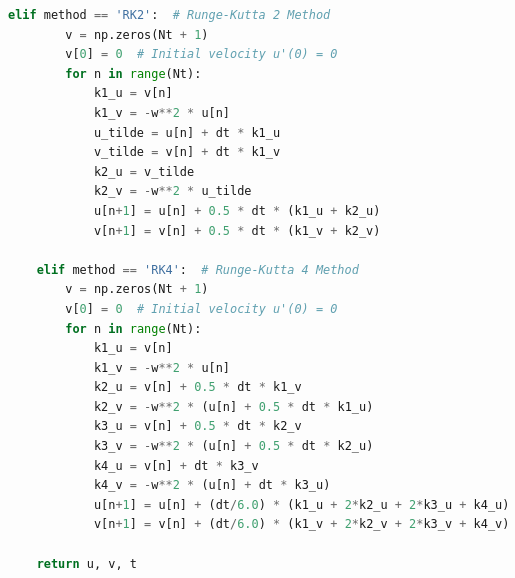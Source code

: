\documentclass[10pt, aspectratio=54]{beamer}
\begin{document}
\begin{frame}[fragile]{}
	\fontsize{5}{5}\selectfont
	\begin{lstlisting}[language=Python]
	elif method == 'RK2':  # Runge-Kutta 2 Method
		v = np.zeros(Nt + 1)
		v[0] = 0  # Initial velocity u'(0) = 0
		for n in range(Nt):
			k1_u = v[n]
			k1_v = -w**2 * u[n]
			u_tilde = u[n] + dt * k1_u
			v_tilde = v[n] + dt * k1_v
			k2_u = v_tilde
			k2_v = -w**2 * u_tilde
			u[n+1] = u[n] + 0.5 * dt * (k1_u + k2_u)
			v[n+1] = v[n] + 0.5 * dt * (k1_v + k2_v)
		
	elif method == 'RK4':  # Runge-Kutta 4 Method
		v = np.zeros(Nt + 1)
		v[0] = 0  # Initial velocity u'(0) = 0
		for n in range(Nt):
			k1_u = v[n]
			k1_v = -w**2 * u[n]
			k2_u = v[n] + 0.5 * dt * k1_v
			k2_v = -w**2 * (u[n] + 0.5 * dt * k1_u)
			k3_u = v[n] + 0.5 * dt * k2_v
			k3_v = -w**2 * (u[n] + 0.5 * dt * k2_u)
			k4_u = v[n] + dt * k3_v
			k4_v = -w**2 * (u[n] + dt * k3_u)
			u[n+1] = u[n] + (dt/6.0) * (k1_u + 2*k2_u + 2*k3_u + k4_u)
			v[n+1] = v[n] + (dt/6.0) * (k1_v + 2*k2_v + 2*k3_v + k4_v)

	return u, v, t		

	\end{lstlisting}
\end{frame}
\end{document}
